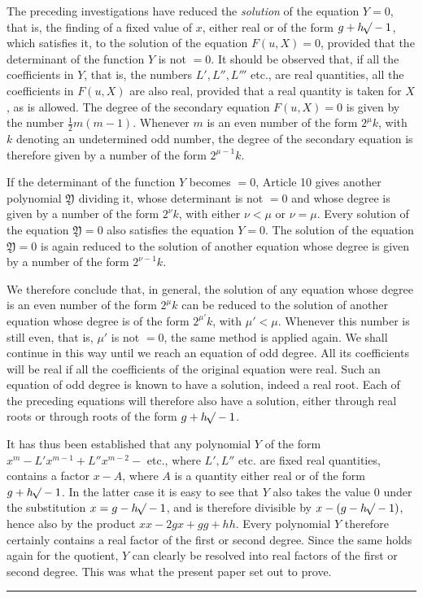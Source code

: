 The preceding investigations have reduced the \textit{solution} of the equation $Y=0$, that is, the finding of a fixed value of $x$, either real or of the form $g+h\mathord{{}^{}\!\surd}-1$, which satisfies it, to the solution of the equation $F(u,X)=0$,
provided that the determinant of the function $Y$ is not $=0$. It should be observed that, if all the coefficients in $Y$, that is, the numbers $L',L'',L'''$ etc., are real quantities, all the coefficients in $F(u,X)$ are also real, provided that a real quantity is taken for $X$, as is allowed. The degree of the secondary equation $F(u,X)=0$ is given by the number $\frac12m(m-1)$. Whenever $m$ is an even number of the form $2^\mu k$, with $k$ denoting an undetermined odd number, the degree of the secondary equation is therefore given by a number of the form $2^{\mu-1}k$.

If the determinant of the function $Y$ becomes $=0$, Article 10 gives another polynomial $\mathfrak{Y}$ dividing it, whose determinant is not $=0$ and whose degree is given by a number of the form $2^\nu k$, with either $\nu<\mu$ or $\nu=\mu$. Every solution of the equation $\mathfrak{Y}=0$ also satisfies the equation $Y=0$. The solution of the equation $\mathfrak{Y}=0$ is again reduced to the solution of another equation whose degree is given by a number of the form $2^{\nu-1}k$.

We therefore conclude that, in general, the solution of any equation whose degree is an even number of the form $2^\mu k$ can be reduced to the solution of another equation whose degree is of the form $2^{\mu'}k$, with $\mu'<\mu$. Whenever this number is still even, that is, $\mu'$ is not $=0$, the same method is applied again. We shall continue in this way until we reach an equation of odd degree. All its coefficients will be real if all the coefficients of the original equation were real. Such an equation of odd degree is known to have a solution, indeed a real root. Each of the preceding equations will therefore also have a solution, either through real roots or through roots of the form $g+h\mathord{{}^{}\!\surd}-1$.

It has thus been established that any polynomial $Y$ of the form $x^m-L'x^{m-1}+L''x^{m-2}-$ etc., where $L',L''$ etc. are fixed real quantities, contains a factor $x-A$, where $A$ is a quantity either real or of the form $g+h\mathord{{}^{}\!\surd}-1$. In the latter case it is easy to see that $Y$ also takes the value 0 under the substitution $x=g-h\mathord{{}^{}\!\surd}-1$, and is therefore divisible by $x-(g-h\mathord{{}^{}\!\surd}-1)$, hence also by the product $xx-2gx+gg+hh$. Every polynomial $Y$ therefore certainly contains a real factor of the first or second degree. Since the same holds again for the quotient, $Y$ can clearly be resolved into real factors of the first or second degree. This was what the present paper set out to prove.
\begin{center}\rule{3cm}{0.3pt}\end{center}
